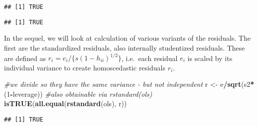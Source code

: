 \documentclass[]{book}
\newenvironment{Shaded}{\begin{snugshade}}{\end{snugshade}}
\newcommand{\CommentTok}[1]{\textcolor[rgb]{0.56,0.35,0.01}{\textit{#1}}}
\newcommand{\DecValTok}[1]{\textcolor[rgb]{0.00,0.00,0.81}{#1}}
\newcommand{\KeywordTok}[1]{\textcolor[rgb]{0.13,0.29,0.53}{\textbf{#1}}}
\newcommand{\NormalTok}[1]{#1}
\newcommand{\OperatorTok}[1]{\textcolor[rgb]{0.81,0.36,0.00}{\textbf{#1}}}
\newcommand{\StringTok}[1]{\textcolor[rgb]{0.31,0.60,0.02}{#1}}
\theoremstyle{definition}
\theoremstyle{definition}
\theoremstyle{definition}
\theoremstyle{remark}
\begin{document}
\begin{Shaded}
\end{Shaded}

\begin{verbatim}
## [1] TRUE
\end{verbatim}

\begin{Shaded}
\end{Shaded}

\begin{verbatim}
## [1] TRUE
\end{verbatim}

In the sequel, we will look at calculation of various variants of the
residuals. The first are the standardized residuals, also internally
studentized residuals. These are defined as
\(r_i = e_i/\{s(1-h_{ii})^{1/2}\}\), i.e.~each residual \(e_i\) is
scaled by its individual variance to create homoscedastic residuals
\(r_i\).

\begin{Shaded}
\begin{Highlighting}[]
\CommentTok{#we divide so they have the same variance - but not independent}
\NormalTok{r <-}\StringTok{ }\NormalTok{e}\OperatorTok{/}\KeywordTok{sqrt}\NormalTok{(s2}\OperatorTok{*}\NormalTok{(}\DecValTok{1}\OperatorTok{-}\NormalTok{leverage)) }
\CommentTok{#also obtainable via rstandard(ols)}
\KeywordTok{isTRUE}\NormalTok{(}\KeywordTok{all.equal}\NormalTok{(}\KeywordTok{rstandard}\NormalTok{(ols), r))}
\end{Highlighting}
\end{Shaded}

\begin{verbatim}
## [1] TRUE
\end{verbatim}
\end{document}
